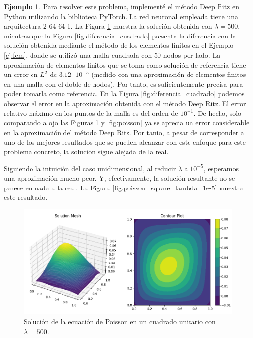 \documentclass[a4paper,11pt,spanish, twoside, leqno]{tfg-uam}
\theoremstyle{definition}
\newtheorem{exmp}[teor]{Ejemplo}
\begin{document}
\begin{mdframed}
\begin{exmp}
        Para resolver este problema, implementé el método Deep Ritz en Python utilizando la biblioteca PyTorch. La red neuronal empleada tiene una arquitectura 2-64-64-1. La Figura \ref{fig:poisson_square} muestra la solución obtenida con $\lambda = 500$, mientras que la Figura \ref{fig:diferencia_cuadrado} presenta la diferencia con la solución obtenida mediante el método de los elementos finitos en el Ejemplo \ref{ej:fem}, donde se utilizó una malla cuadrada con 50 nodos por lado. La aproximación de elementos finitos que se toma como solución de referencia tiene un error en $L^2$ de $3.12\cdot10^{-5}$ (medido con una aproximación de elementos finitos en una malla con el doble de nodos). Por tanto, es suficientemente precisa para poder tomarla como referencia. En la Figura \ref{fig:diferencia_cuadrado} podemos observar el error en la aproximación obtenida con el método Deep Ritz. El error relativo máximo en los puntos de la malla es del orden de $10^{-1}$. De hecho, solo comparando a ojo las Figuras \ref{fig:poisson_square} y \ref{fig:poisson} ya se aprecia un error considerable en la aproximación del método Deep Ritz. Por tanto, a pesar de corresponder a uno de los mejores resultados que se pueden alcanzar con este enfoque para este problema concreto, la solución sigue alejada de la real.

        Siguiendo la intuición del caso unidimensional, al reducir $\lambda$ a $10^{-5}$, esperamos una aproximación mucho peor. Y, efectivamente, la solución resultante no se parece en nada a la real. La Figura \ref{fig:poisson_square_lambda_1e-5} muestra este resultado.

        \begin{figure}[H]
            \centering
            \includegraphics[width=1\textwidth]{Figuras/PoissonSquareBien.png}
            \caption{Solución de la ecuación de Poisson en un cuadrado unitario con $\lambda = 500$.}
            \label{fig:poisson_square}
        \end{figure}


\end{exmp}
\end{mdframed}
\end{document}
